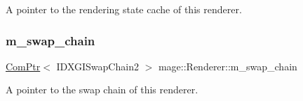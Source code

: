 A pointer to the rendering state cache of this renderer. \hypertarget{classmage_1_1_renderer_a5419a7a11e8f0f69e92dd6a5cb9bd217}{}\label{classmage_1_1_renderer_a5419a7a11e8f0f69e92dd6a5cb9bd217} 
\subsubsection{\texorpdfstring{m\+\_\+swap\+\_\+chain}{m\_swap\_chain}}
{\footnotesize\ttfamily \hyperlink{namespacemage_ae74f374780900893caa5555d1031fd79}{Com\+Ptr}$<$ I\+D\+X\+G\+I\+Swap\+Chain2 $>$ mage\+::\+Renderer\+::m\+\_\+swap\+\_\+chain\hspace{0.3cm}{\ttfamily [private]}}

A pointer to the swap chain of this renderer. 